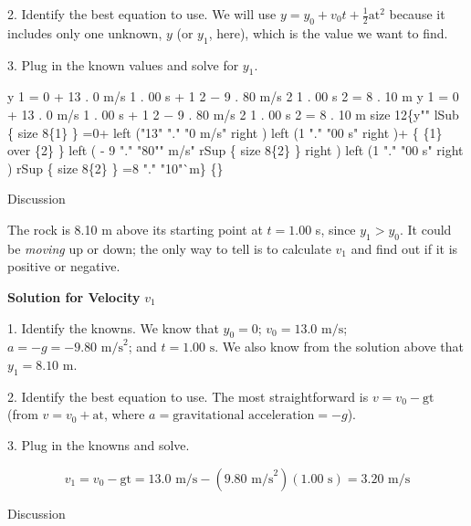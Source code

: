 \documentclass[
]{book}
\newenvironment{tinysection}{}{}
\begin{document}
2. Identify the best equation to use. We will use
\({{y = {y_{0} + v_{0}}}{t + \frac{1}{2}}\text{at}^{2}}{}\) because it
includes only one unknown, \(y{}\) (or \(y_{1}{}\),
here),\emph{} which is the value we want to
find.

3. Plug in the known values and solve for \(y_{1}{}\).

\leavevmode\hypertarget{import-auto-id2302522}{}%
{y 1 = 0 + 13 . 0 m/s 1 . 00 s + 1 2 − 9 . 80 m/s 2 1 . 00 s 2 = 8 . 10
m y 1 = 0 + 13 . 0 m/s 1 . 00 s + 1 2 − 9 . 80 m/s 2 1 . 00 s 2 = 8 . 10
m size 12\{y"" lSub \{ size 8\{1\} \} =0+ left ("13" "." "0 m/s"
right ) left (1 "." "00 s" right )+ \{ \{1\} over \{2\} \} left ( - 9
"." "80"" m/s" rSup \{ size 8\{2\} \} right ) left (1 "." "00 s"
right ) rSup \{ size 8\{2\} \} =8 "." "10"`m\} \{\}}

\begin{tinysection}

{Discussion}

\end{tinysection}

The rock is 8.10 m above its starting point at
\({{t = 1}\text{.}\text{00}}{}\) s, since \({y_{1} > y_{0}}{}\). It could be
\emph{moving} up or down; the only way to tell is to calculate \(v_{1}{}\) and
find out if it is positive or negative.

\textbf{Solution for Velocity} \(v_{1}{}\)

1. Identify the knowns. We know that \({y_{0} = 0}{}\);
\({{v_{0} = \text{13}}\text{.}\text{0\ m/s}}{}\);
\({{{a = {- g}} = {- 9}}\text{.}\text{80\ m/s}^{2}}{}\); and
\({{t = 1}\text{.}\text{00\ s}}{}\). We also know from the solution above
that \({{y_{1} = 8}\text{.}\text{10\ m}}{}\).

2. Identify the best equation to use. The most straightforward is
\({v = {v_{0} - \text{gt}}}{}\) (from \({v = {v_{0} + \text{at}}}{}\), where
\({{a = \text{gravitational\ acceleration}} = {- g}}{}\)).

3. Plug in the knowns and solve.

\leavevmode\hypertarget{import-auto-id1688803}{}%
\[{{{v_{1} = {v_{0} - \text{gt}}} = \text{13}}\text{.}{\text{0\ m/s} - \left( {9\text{.}\text{80\ m/s}^{2}} \right)}{\left( {1\text{.}\text{00\ s}} \right) = 3}\text{.}\text{20\ m/s}}{}\]

\begin{tinysection}

{Discussion}

\end{tinysection}
\end{document}
